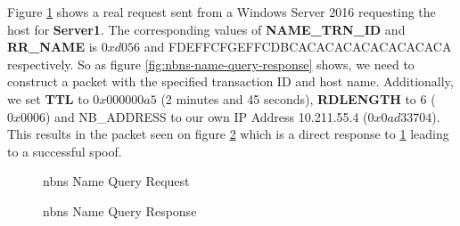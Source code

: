 \documentclass{article}
\begin{document}
Figure \ref{fig:nbns-request} shows a real request sent from a Windows Server 2016 requesting the host for \textbf{Server1}. The corresponding values of \textbf{NAME\_TRN\_ID} and \textbf{RR\_NAME} is $0xd056$ and FDEFFCFGEFFCDBCACACACACACACACACA respectively. So as figure \ref{fig:nbns-name-query-response} shows, we need to construct a packet with the specified transaction ID and host name. Additionally, we set \textbf{TTL} to $0x000000a5$ (2 minutes and 45 seconds), \textbf{RDLENGTH} to 6 ($0x0006$) and NB\_ADDRESS to our own IP Address 10.211.55.4 ($0x0ad33704$). This results in the packet seen on figure \ref{fig:nbns-response} which is a direct response to \ref{fig:nbns-request} leading to a successful spoof.

\begin{figure}[H]
	\scriptsize
	\par
	\centering
	\varwidth{\linewidth}
	
	\endvarwidth
	\par

	\caption{\gls{nbns} Name Query Request}
	\label{fig:nbns-request}
\end{figure}

\begin{figure}[H]
	\scriptsize
	\par
	\centering
	\varwidth{\linewidth}
	
	\endvarwidth
	\par

	\caption{\gls{nbns} Name Query Response}
	\label{fig:nbns-response}
\end{figure}
\end{document}

